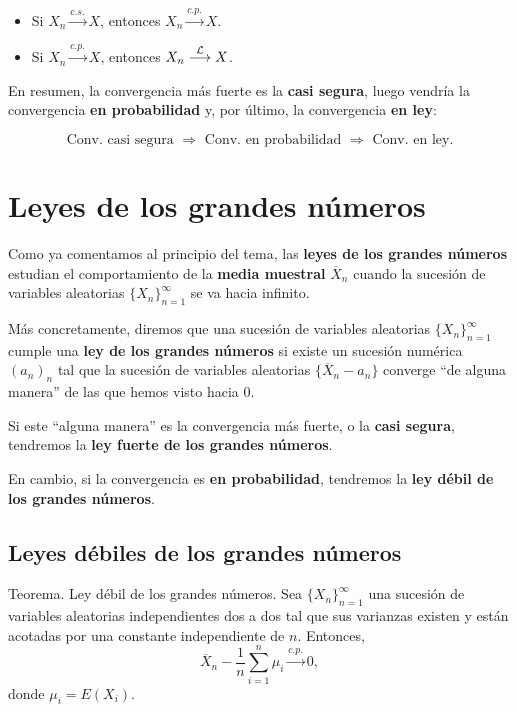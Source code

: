 \documentclass[]{book}
\begin{document}
\begin{itemize}
\item
  Si \(X_n\stackrel{c.s.}{\longrightarrow} X\), entonces \(X_n\stackrel{c.p.}{\longrightarrow} X\).
\item
  Si \(X_n\stackrel{c.p.}{\longrightarrow} X\), entonces \(X_n\stackrel{{\cal L}}{\longrightarrow} X\).
\end{itemize}

En resumen, la convergencia más fuerte es la \textbf{casi segura}, luego vendría la convergencia \textbf{en probabilidad} y, por último, la convergencia \textbf{en ley}:

\[
\mbox{Conv. casi segura }\Rightarrow \mbox{ Conv. en probabilidad }\Rightarrow\mbox{ Conv. en ley.}
\]

\hypertarget{leyes-de-los-grandes-nuxfameros}{%
\section{Leyes de los grandes números}\label{leyes-de-los-grandes-nuxfameros}}

Como ya comentamos al principio del tema, las \textbf{leyes de los grandes números} estudian el comportamiento de la \textbf{media muestral} \(\overline{X}_n\) cuando la sucesión de variables aleatorias \(\{X_n\}_{n=1}^\infty\) se va hacia infinito.

Más concretamente, diremos que una sucesión de variables aleatorias \(\{X_n\}_{n=1}^\infty\) cumple una \textbf{ley de los grandes números} si existe un sucesión numérica \((a_n)_n\) tal que la sucesión de variables aleatorias \(\{\overline{X}_n-a_n\}\) converge ``de alguna manera'' de las que hemos visto hacia 0.

Si este ``alguna manera'' es la convergencia más fuerte, o la \textbf{casi segura}, tendremos la \textbf{ley fuerte de los grandes números}.

En cambio, si la convergencia es \textbf{en probabilidad}, tendremos la \textbf{ley débil de los grandes números}.

\hypertarget{leyes-duxe9biles-de-los-grandes-nuxfameros}{%
\subsection{Leyes débiles de los grandes números}\label{leyes-duxe9biles-de-los-grandes-nuxfameros}}

Teorema. Ley débil de los grandes números.
Sea \(\{X_n\}_{n=1}^\infty\) una sucesión de variables aleatorias independientes dos a dos tal que sus varianzas existen y están acotadas por una constante independiente de \(n\). Entonces,
\[
\overline{X}_n-\frac{1}{n}\sum_{i=1}^n \mu_i\stackrel{c.p.}{\longrightarrow} 0,
\]
donde \(\mu_i = E(X_i)\).
\end{document}
